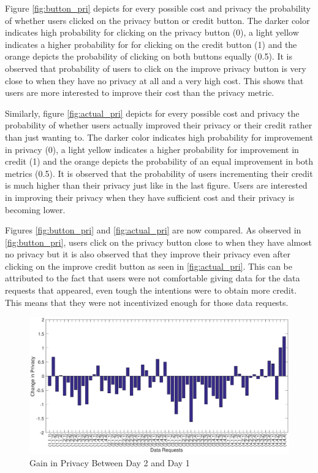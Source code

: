 Figure \ref{fig:button_pri} depicts for every possible cost and privacy the probability of whether users clicked on the privacy button or credit button. The darker color indicates high probability for clicking on the privacy button (0), a light yellow indicates a higher probability for for clicking on the credit button (1) and the orange depicts the probability of clicking on both buttons equally (0.5). It is observed that probability of users to click on the improve privacy button is very close to when they have no privacy at all and a very high cost. This shows that users are more interested to improve their cost than the privacy metric. 

Similarly, figure \ref{fig:actual_pri} depicts for every possible cost and privacy the probability of whether users actually improved their privacy or their credit rather than just wanting to. The darker color indicates high probability for improvement in privacy (0), a light yellow indicates a higher probability for improvement in credit (1) and the orange depicts the probability of an equal improvement in both metrics (0.5). It is observed that the probability of users incrementing their credit is much higher than their privacy just like in the last figure. Users are interested in improving their privacy when they have sufficient cost
and their privacy is becoming lower.

Figures \ref{fig:button_pri} and \ref{fig:actual_pri} are now compared. As observed in \ref{fig:button_pri}, users click on the privacy button close to when they have almost no privacy but it is also observed that they improve their privacy even after clicking on the improve credit button as seen in \ref{fig:actual_pri}. This can be attributed to the fact that users were not comfortable giving data for the data requests that appeared, even tough the intentions were to obtain more credit. This means that they were not incentivized enough for those data requests.


\begin{figure}[ht!]
\centering
\includegraphics[width=\textwidth,keepaspectratio]{./images/day2_day1_privacy}
\caption{Gain in Privacy Between Day 2 and Day 1}
\label{fig:day2_day1}
\end{figure}

